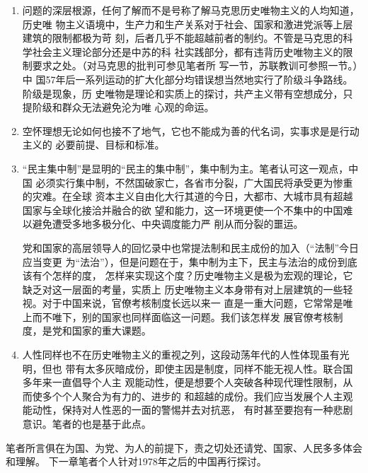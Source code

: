 \begin{enumerate}
\item 问题的深层根源，任何了解而不是号称了解马克思历史唯物主义的人均知道，历史唯
  物主义语境中，生产力和生产关系对于社会、国家和激进党派等上层建筑的限制都极为苛
  刻，后者几乎不能超越前者的制约。不管是马克思的科学社会主义理论部分还是中苏的科
  社实践部分，都有违背历史唯物主义的限制要求之处。（对马克思的批判可参见笔者所
  写一节，苏联教训可参照一节。）中
  国57年后一系列运动的扩大化部分均错误想当然地实行了阶级斗争路线。阶级是现象，历
  史唯物是理论和实质上的探讨，共产主义带有空想成分，只提阶级和群众无法避免沦为唯
  心观的命运。

\item 空怀理想无论如何也接不了地气，它也不能成为善的代名词，实事求是是行动主义的
  必要前提、目标和标准。
 
\item ``民主集中制''是显明的``民主的集中制''，集中制为主。笔者认可这一观点，中国
  必须实行集中制，不然国破家亡，各省市分裂，广大国民将承受更为惨重的灾难。在全球
  资本主义自由化大行其道的今日，大都市、大城市具有超越国家与全球化接洽并融合的欲
  望和能力，这一环境更使一个不集中的中国难以避免遭受多地多极分化、中央调度能力严
  削从而分裂的噩运。

  党和国家的高层领导人的回忆录中也常提法制和民主成份的加入（``法制''今日应当变更
  为``法治''），但是问题在于，集中制为主下，民主与法治的成份到底该有个怎样的度，
  怎样来实现这个度？历史唯物主义是极为宏观的理论，它缺乏对这一层面的考量，实质上
  历史唯物主义本身带有对上层建筑的一些轻视。对于中国来说，官僚考核制度长远以来一
  直是一重大问题，它常常是唯上而不唯下，别的国家也同样面临这一问题。我们该怎样发
  展官僚考核制度，是党和国家的重大课题。

\item 人性同样也不在历史唯物主义的重视之列，这段动荡年代的人性体现虽有光明，但也
  带有太多灰暗成份，即使主因是制度，同样不能无视人性。联合国多年来一直倡导个人主
  观能动性，便是想要个人突破各种现代理性限制，从而使多个个人聚合为有力的、进步的
  和超越的成份。我们应当发展个人主观能动性，保持对人性恶的一面的警惕并去对抗恶，
  有时甚至要抱有一种悲剧意识。笔者的也是基于此点。
  
\end{enumerate}

笔者所言俱在为国、为党、为人的前提下，责之切处还请党、国家、人民多多体会和理解。
下一章笔者个人针对1978年之后的中国再行探讨。






